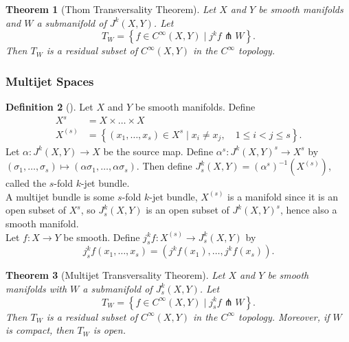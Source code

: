 \documentclass[reqno]{amsart}
\newtheorem{theorem}{Theorem}[section]
\theoremstyle{definition}
\newtheorem{definition}[theorem]{Definition}
\theoremstyle{remark}
\begin{document}
\begin{theorem}[Thom Transversality Theorem]
    Let $X$ and $Y$ be smooth manifolds and
    $W$ a submanifold of $J^{k}(X,Y)$. Let
    \[
    T_W = \left\{ f \in 
    C^{\infty}(X,Y)  \mid j^{k}f \pitchfork W \right\} .
    \] 
    Then $T_W$ is a residual subset of 
    $C^{\infty}(X,Y)$ in the $C^{\infty}$ topology.
\end{theorem}



\subsubsection{Multijet Spaces}

\begin{definition}[]
Let $X$ and $Y$ be smooth manifolds.
Define
\begin{align*}
    X^{s} &= X \times \ldots \times X\\
    X^{(s)}
    &= \left\{ \left( x_1,\ldots,x_s \right) 
    \in X^{s}  \mid x_i \neq x_j, \quad 1 \le i <j \le s\right\} .
\end{align*}
Let
$\alpha \colon J^{k}(X,Y) \to X$ be the source map.
Define
$\alpha^s \colon J^{k}(X,Y)^{s} \to X^{s}$ 
by $\left( \sigma_1,\ldots, \sigma_s \right) 
\mapsto \left( \alpha \sigma_1, \ldots,
\alpha \sigma_s \right) $.
Then
define
$J_s^{k}(X,Y) = \left( \alpha^s \right)^{-1}
\left( X^{(s)} \right) $, called the
$s$-fold $k$-jet bundle. \\
A multijet bundle is some
$s$-fold $k$-jet bundle,
$X^{(s)}$ is a manifold since it is an open
subset of $X^{s}$, so
$J_s^{k}(X,Y)$ is an open subset
of
$J^{k}(X,Y)^{s}$, hence also a smooth manifold.\\
Let
$f \colon X \to Y$ be smooth.
Define
$j_s^{k} f \colon X^{(s)}\to 
J_{s}^{k}(X,Y)$ by
\[
j_s^{k}f\left( x_1,\ldots, x_s \right) 
= \left( j^{k}f(x_1), \ldots,
j^{k}f(x_s) \right).
\] 
\end{definition}


\begin{theorem}[Multijet Transversality Theorem]\label{Multijet-Transversality}
    Let $X$ and $Y$ be smooth manifolds with
    $W$ a submanifold of $J_s^{k}(X,Y)$. Let
    \[
    T_W = 
    \left\{ f \in C^{\infty}(X,Y) \mid 
    j_s^{k}f \pitchfork W \right\} .
    \] 
    Then
    $T_W$ is a residual subset of
    $C^{\infty}(X,Y)$ in the
    $C^{\infty}$ topology.
    Moreover, if $W$ is compact, then
    $T_W$ is open.
\end{theorem}
\end{document}
